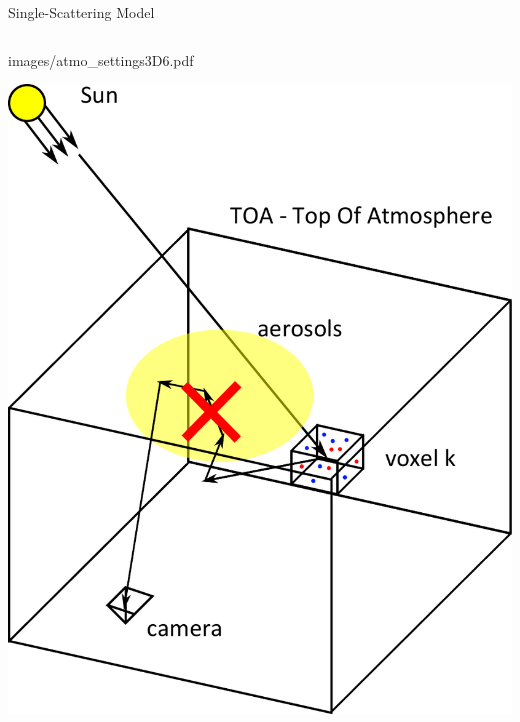 \documentclass[compress,red,12pt]{beamer}
\begin{document}
\begin{frame}{Single-Scattering Model}
\begin{columns}[c]
\begin{overlayarea}{\columnwidth}{8cm}
{{          {images/atmo_settings3D6.pdf}}}
       {\centerline{\includegraphics[width=\columnwidth]
          {images/atmo_settings3D7.pdf}}}
    \end{overlayarea}
  \end{columns}
\end{frame}

\end{document}
